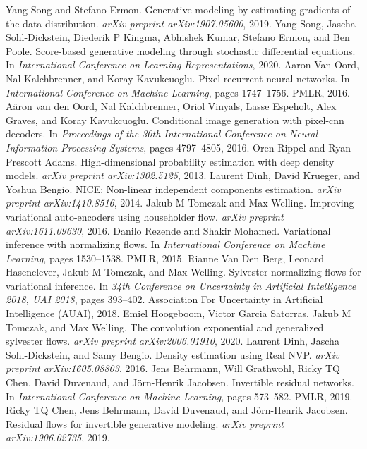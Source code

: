 \begin{chapterreferences}
 Yang Song and Stefano Ermon. Generative modeling by estimating gradients of the data distribution. \emph{arXiv preprint arXiv:1907.05600}, 2019.
 Yang Song, Jascha Sohl-Dickstein, Diederik P Kingma, Abhishek Kumar, Stefano Ermon, and Ben Poole. Score-based generative modeling through stochastic differential equations. In \emph{International Conference on Learning Representations}, 2020.
 Aaron Van Oord, Nal Kalchbrenner, and Koray Kavukcuoglu. Pixel recurrent neural networks. In \emph{International Conference on Machine Learning}, pages 1747–1756. PMLR, 2016.
 Aäron van den Oord, Nal Kalchbrenner, Oriol Vinyals, Lasse Espeholt, Alex Graves, and Koray Kavukcuoglu. Conditional image generation with pixel-cnn decoders. In \emph{Proceedings of the 30th International Conference on Neural Information Processing Systems}, pages 4797–4805, 2016.
 Oren Rippel and Ryan Prescott Adams. High-dimensional probability estimation with deep density models. \emph{arXiv preprint arXiv:1302.5125}, 2013.
 Laurent Dinh, David Krueger, and Yoshua Bengio. NICE: Non-linear independent components estimation. \emph{arXiv preprint arXiv:1410.8516}, 2014.
 Jakub M Tomczak and Max Welling. Improving variational auto-encoders using householder flow. \emph{arXiv preprint arXiv:1611.09630}, 2016.
 Danilo Rezende and Shakir Mohamed. Variational inference with normalizing flows. In \emph{International Conference on Machine Learning}, pages 1530–1538. PMLR, 2015.
 Rianne Van Den Berg, Leonard Hasenclever, Jakub M Tomczak, and Max Welling. Sylvester normalizing flows for variational inference. In \emph{34th Conference on Uncertainty in Artificial Intelligence 2018, UAI 2018}, pages 393–402. Association For Uncertainty in Artificial Intelligence (AUAI), 2018.
 Emiel Hoogeboom, Victor Garcia Satorras, Jakub M Tomczak, and Max Welling. The convolution exponential and generalized sylvester flows. \emph{arXiv preprint arXiv:2006.01910}, 2020.
 Laurent Dinh, Jascha Sohl-Dickstein, and Samy Bengio. Density estimation using Real NVP. \emph{arXiv preprint arXiv:1605.08803}, 2016.
 Jens Behrmann, Will Grathwohl, Ricky TQ Chen, David Duvenaud, and Jörn-Henrik Jacobsen. Invertible residual networks. In \emph{International Conference on Machine Learning}, pages 573–582. PMLR, 2019.
 Ricky TQ Chen, Jens Behrmann, David Duvenaud, and Jörn-Henrik Jacobsen. Residual flows for invertible generative modeling. \emph{arXiv preprint arXiv:1906.02735}, 2019.

\end{chapterreferences}
